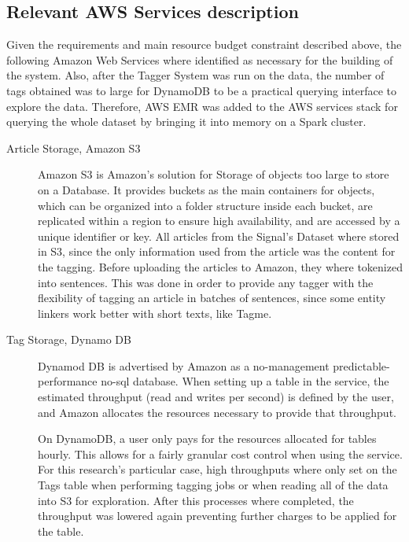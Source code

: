 \subsection{Relevant AWS Services description}
Given the requirements and main resource budget constraint described above, the following Amazon Web Services where identified as necessary for the building of the system.
Also, after the Tagger System was run on the data, the number of tags obtained was to large for DynamoDB to be a practical querying interface to explore the data.
Therefore, AWS EMR\cite{aws_emr} was added to the AWS services stack for querying the whole dataset by bringing it into memory on a Spark cluster.
\begin{description}
\item[Article Storage, Amazon S3]
Amazon S3 is Amazon's solution for Storage of objects too large to store on a Database.
It provides buckets as the main containers for objects, which can be organized into a folder structure inside each bucket,
are replicated within a region to ensure high availability, and are accessed by a unique identifier or key.
All articles from the Signal's Dataset where stored in S3, since the only information used from the article was the content for the tagging.
Before uploading the articles to Amazon, they where tokenized into sentences.
This was done in order to provide any tagger with the flexibility of tagging an article in batches of sentences, since some entity linkers work better with short texts, like Tagme\cite{tagme}.
\item[Tag Storage, Dynamo DB]
Dynamod DB is advertised by Amazon as a no-management predictable-performance no-sql database. When setting up a table in the service, the estimated throughput (read and writes per second) is defined by the user, and Amazon allocates the resources necessary to provide that throughput. 
  
On DynamoDB, a user only pays for the resources allocated for tables hourly.
This allows for a fairly granular cost control when using the service.
For this research's particular case, high throughputs where only set on the Tags table when performing tagging jobs or when reading all of the data into S3 for exploration.
After this processes where completed, the throughput was lowered again preventing further charges to be applied for the table.


\end{description}
